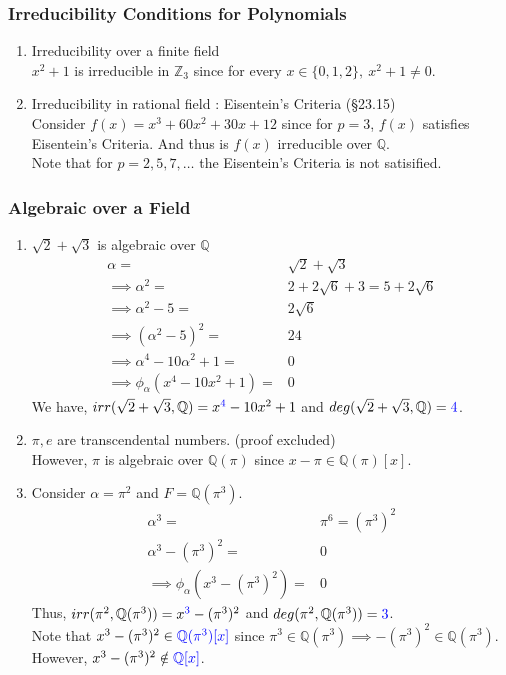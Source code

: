 \subsubsection{Irreducibility Conditions for Polynomials}
\begin{enumerate}
	\item Irreducibility over a finite field\\
		$x^2+1$ is irreducible in $\mathbb{Z}_3$ since for every $x \in \{ 0,1,2 \},\ x^2+1 \ne 0$.
\item Irreducibility in rational field : Eisentein's Criteria (\S23.15) \\
	Consider $f(x) = x^3+60x^2+30x+12$ since for $p=3$, $f(x)$ satisfies Eisentein's Criteria. And thus is $f(x)$ irreducible over $\mathbb{Q}$.\\
	Note that for $p = 2,5,7,\dots$ the Eisentein's Criteria is not satisified.
\end{enumerate}
\subsubsection{Algebraic over a Field}
\begin{enumerate}
	\item $\sqrt{2}+\sqrt{3}$ is algebraic over $\mathbb{Q}$ \cite[Exercise 29.2]{fraleigh}
	\begin{align*}
		\alpha = & \sqrt{2} + \sqrt{3} \\
		\implies \alpha^2 = & 2 + 2\sqrt{6} + 3 =  5 + 2\sqrt{6}  \\
		\implies \alpha^2 - 5 =  & 2\sqrt{6} \\
		\implies  (\alpha^2-5)^2 = & 24 \\
		\implies \alpha^4 - 10\alpha^2 + 1 = & 0 \\
		\implies \phi_{\alpha}(x^4 - 10x^2 + 1) = & 0 
	\end{align*}
		We have, $irr(\sqrt{2}+\sqrt{3},\mathbb{Q}) = x^{\textcolor{blue}{4}}-10x^2+1$ and $deg(\sqrt{2}+\sqrt{3},\mathbb{Q}) = \textcolor{blue}{4}$.
	\item $\pi,e$ are transcendental numbers. (proof excluded)\\
		However, $\pi$ is algebraic over $\mathbb{Q}(\pi)$ since $x-\pi \in \mathbb{Q}(\pi)[x]$.
		
	\item Consider $\alpha = \pi^2$ and $F = \mathbb{Q}(\pi^3)$. \cite[Exercise 29.16]{fraleigh}
	\begin{align*}
		\alpha^3 = & \pi^6 = (\pi^3)^2 \\
		\alpha^3-(\pi^3)^2 = & 0 \\
		\implies \phi_\alpha(x^3-(\pi^3)^2) = & 0 
	\end{align*}
	Thus, $irr(\pi^2,\mathbb{Q}(\pi^3)) = x^{\textcolor{blue}{3}}-(\pi^3)^2$ and $deg(\pi^2,\mathbb{Q}(\pi^3)) = \textcolor{blue}{3}$.\\ 
		Note that $x^3-(\pi^3)^2 \in \textcolor{blue}{\mathbb{Q}(\pi^3)[x]}$ since $\pi^3 \in \mathbb{Q}(\pi^3) \implies -(\pi^3)^2 \in \mathbb{Q}(\pi^3)$. However, $x^3-(\pi^3)^2 \notin \textcolor{blue}{\mathbb{Q}[x]}$.
\end{enumerate}
